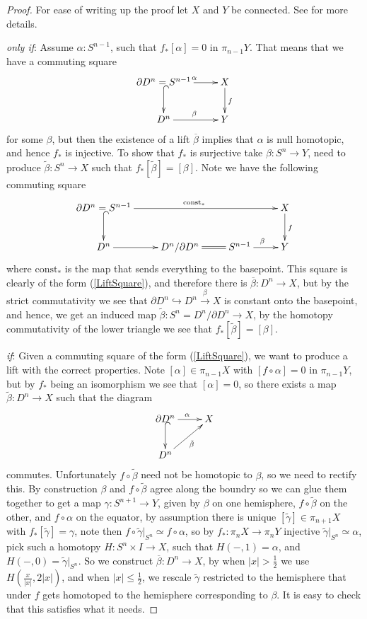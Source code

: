 \documentclass{article}
\newtheorem{proposed work}[theorem]{Proposed Work}
\newcommand{\xymat}[1]{\begin{align*}\xymatrix{ #1}\end{align*}}
\begin{document}
\begin{proof}
For ease of writing up the proof let $X$ and $Y$ be connected. See \cite{may1999concise} for more details.

\emph{only if}: Assume $\alpha: S^{n-1}$, such that $f_*[\alpha]=0$ in $\pi_{n-1}Y$. That means that we have a commuting square 
\xymat{\partial D^n=S^{n-1} \ar[r]^\alpha \ar@{^{(}->}[d] & X \ar[d]^f \\ D^n \ar[r]^\beta & Y} for some $\beta$, but then the existence of a lift $\overline{\beta}$ implies that $\alpha$ is null homotopic, and hence $f_*$ is injective. To show that $f_*$ is surjective take $\beta: S^n\to Y$, need to produce $\tilde{\beta}: S^n\to X$ such that $f_*[\tilde{\beta}]=[\beta]$. Note we have the following commuting square
\xymat{\partial D^n=S^{n-1} \ar[rrr]^{\text{const}_*} \ar@{^{(}->}[d]& & & X \ar[d]^f \\ D^n \ar[r] & D^n/\partial D^n \ar@{=}[r]&S^{n-1} \ar[r]^\beta & Y}
where $\text{const}_*$ is the map that sends everything to the basepoint. This square is clearly of the form (\ref{LiftSquare}), and therefore there is $\overline{\beta}: D^n \to X$, but by the strict commutativity we see that $\partial D^n \hookrightarrow D^n \stackrel{\beta}{\to} X$ is constant onto the basepoint, and hence, we get an induced map $\tilde{\beta}:S^n=D^n/\partial D^n \to X$, by the homotopy commutativity of the lower triangle we see that $f_*[\tilde{\beta}]=[\beta]$.

\emph{if}: Given a commuting square of the form (\ref{LiftSquare}), we want to produce a lift with the correct properties. Note $[\alpha]\in\pi_{n-1} X$ with $[f\circ \alpha]=0$ in $\pi_{n-1} Y$, but by $f_*$ being an isomorphism we see that $[\alpha]=0$, so there exists a map $\tilde{\beta}:D^n\to X$ such that the diagram
\xymat{\partial D^n \ar@{^{(}->}[d] \ar[r]^\alpha & X \\ D^n\ar[ur]_{\tilde{\beta}}}
commutes. Unfortunately $f\circ \tilde{\beta}$ need not be homotopic to $\beta$, so we need to rectify this. By construction $\beta$ and $f\circ \tilde{\beta}$ agree along the boundry so we can glue them together to get a map $\gamma: S^{n+1}\to Y$, given by $\beta$ on one hemisphere, $f\circ \tilde{\beta}$ on the other, and $f\circ \alpha$ on the equator, by assumption there is unique $[\tilde{\gamma}]\in \pi_{n+1}X$ with $f_*[\tilde{\gamma}]=\gamma$, note then $f\circ \tilde{\gamma}|_{S^n}\simeq f\circ \alpha$, so by $f_*:\pi_nX \to \pi_nY$ injective $\tilde{\gamma}|_{S^n}\simeq \alpha$, pick such a homotopy $H:S^n\times I \to X$, such that $H(-,1)=\alpha$, and $H(-,0)=\tilde{\gamma}|_{S^n}$. So we construct $\overline{\beta}: D^n\to X$, by when $|x|>\frac{1}{2}$ we use $H(\frac{x}{|x|}, 2|x|)$, and when $|x| \leq \frac{1}{2}$, we rescale $\tilde{\gamma}$ restricted to the hemisphere that under $f$ gets homotoped to the hemisphere corresponding to $\beta$. It is easy to check that this satisfies what it needs.
\end{proof}
\end{document}
